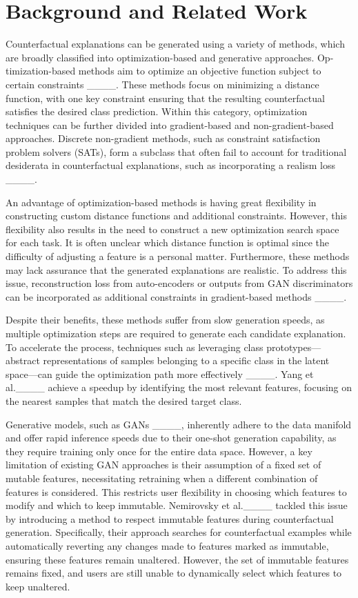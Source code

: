 \section{Background and Related Work}
Counterfactual explanations can be generated using a variety of methods, which are broadly classified into optimization-based and generative approaches. Op-timization-based methods aim to optimize an objective function subject to certain constraints ____. These methods focus on minimizing a distance function, with one key constraint ensuring that the resulting counterfactual satisfies the desired class prediction. Within this category, optimization techniques can be further divided into gradient-based and non-gradient-based approaches. Discrete non-gradient methods, such as constraint satisfaction problem solvers (SATs), form a subclass that often fail to account for traditional desiderata in counterfactual explanations, such as incorporating a realism loss ____.

 An advantage of optimization-based methods is having great flexibility in constructing custom distance functions and additional constraints. However, this flexibility also results in the need to construct a new optimization search space for each task. It is often unclear which distance function is optimal since the difficulty of adjusting a feature is a personal matter. Furthermore, these methods may lack assurance that the generated explanations are realistic. To address this issue, reconstruction loss from auto-encoders or outputs from GAN discriminators can be incorporated as additional constraints in gradient-based methods ____. 
 
 Despite their benefits, these methods suffer from slow generation speeds, as multiple optimization steps are required to generate each candidate explanation. To accelerate the process, techniques such as leveraging class prototypes—abstract representations of samples belonging to a specific class in the latent space—can guide the optimization path more effectively ____. Yang et al.____ achieve a speedup by identifying the most relevant features, focusing on the nearest samples that match the desired target class.

Generative models, such as GANs ____, inherently adhere to the data manifold and offer rapid inference speeds due to their one-shot generation capability, as they require training only once for the entire data space. However, a key limitation of existing GAN approaches is their assumption of a fixed set of mutable features, necessitating retraining when a different combination of features is considered. This restricts user flexibility in choosing which features to modify and which to keep immutable. Nemirovsky et al.____ tackled this issue by introducing a method to respect immutable features during counterfactual generation. Specifically, their approach searches for counterfactual examples while automatically reverting any changes made to features marked as immutable, ensuring these features remain unaltered. However, the set of immutable features remains fixed, and users are still unable to dynamically select which features to keep unaltered. 


